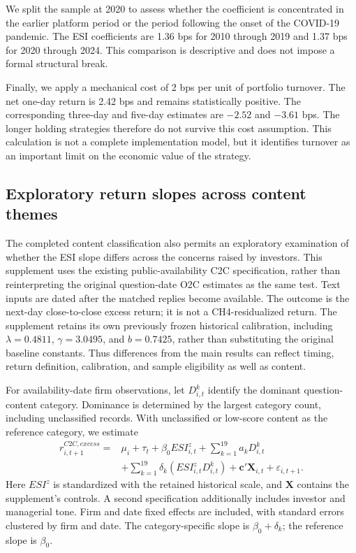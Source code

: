 \documentclass[12pt]{article}
\begin{document}
We split the sample at 2020 to assess whether the coefficient is concentrated in the earlier platform period or the period following the onset of the COVID-19 pandemic. The ESI coefficients are 1.36 bps for 2010 through 2019 and 1.37 bps for 2020 through 2024. This comparison is descriptive and does not impose a formal structural break.

Finally, we apply a mechanical cost of 2 bps per unit of portfolio turnover. The net one-day return is 2.42 bps and remains statistically positive. The corresponding three-day and five-day estimates are $-2.52$ and $-3.61$ bps. The longer holding strategies therefore do not survive this cost assumption. This calculation is not a complete implementation model, but it identifies turnover as an important limit on the economic value of the strategy.





\subsection{Exploratory return slopes across content themes}\label{sec:topic_slopes}

The completed content classification also permits an exploratory examination of whether the ESI slope differs across the concerns raised by investors. This supplement uses the existing public-availability C2C specification, rather than reinterpreting the original question-date O2C estimates as the same test. Text inputs are dated after the matched replies become available. The outcome is the next-day close-to-close excess return; it is not a CH4-residualized return. The supplement retains its own previously frozen historical calibration, including $\lambda=0.4811$, $\gamma=3.0495$, and $b=0.7425$, rather than substituting the original baseline constants. Thus differences from the main results can reflect timing, return definition, calibration, and sample eligibility as well as content.

For availability-date firm observations, let $D^k_{i,t}$ identify the dominant question-content category. Dominance is determined by the largest category count, including unclassified records. With unclassified or low-score content as the reference category, we estimate
\begin{equation}\label{eq:topic_slopes}
\begin{split}
r^{C2C,excess}_{i,t+1}={}&\mu_i+\tau_t+\beta_0 ESI^z_{i,t}
+\sum_{k=1}^{19}a_kD^k_{i,t}\\
&+\sum_{k=1}^{19}\delta_k(ESI^z_{i,t}D^k_{i,t})
+\boldsymbol{c}'\mathbf X_{i,t}+\varepsilon_{i,t+1}.
\end{split}
\end{equation}
Here $ESI^z$ is standardized with the retained historical scale, and $\mathbf X$ contains the supplement's controls. A second specification additionally includes investor and managerial tone. Firm and date fixed effects are included, with standard errors clustered by firm and date. The category-specific slope is $\beta_0+\delta_k$; the reference slope is $\beta_0$.
\end{document}
